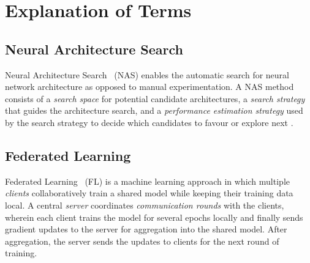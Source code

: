 \section{Explanation of Terms}

\subsection{Neural Architecture Search}

Neural Architecture Search~\cite{nas_with_rl_2017} (NAS) enables the automatic search for neural network architecture as opposed to manual experimentation. A NAS method consists of a \textit{search space} for potential candidate architectures, a \textit{search strategy} that guides the architecture search, and a \textit{performance estimation strategy} used by the search strategy to decide which candidates to favour or explore next \cite{nas_survey_2019}.

\subsection{Federated Learning}

Federated Learning~\cite{fl_seminal_2017} (FL) is a machine learning approach in which multiple \textit{clients} collaboratively train a shared model while keeping their training data local. A central \textit{server} coordinates \textit{communication rounds} with the clients, wherein each client trains the model for several epochs locally and finally sends gradient updates to the server for aggregation into the shared model. After aggregation, the server sends the updates to clients for the next round of training.